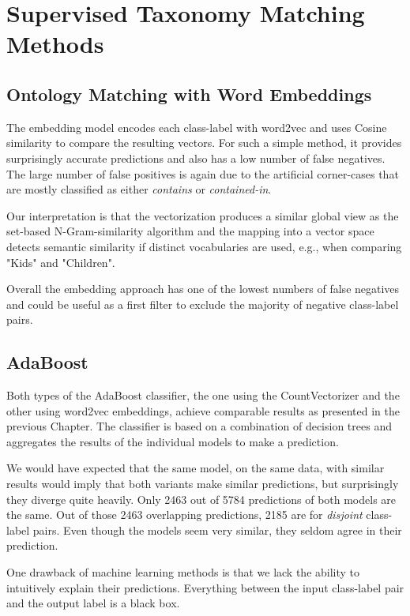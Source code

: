 \section{Supervised Taxonomy Matching Methods}

\subsection{Ontology Matching with Word Embeddings}

The embedding model encodes each class-label with word2vec and uses Cosine similarity to compare the resulting vectors.
For such a simple method, it provides surprisingly accurate predictions and also has a low number of false negatives.
The large number of false positives is again due to the artificial corner-cases that are mostly classified as either
\emph{contains} or \emph{contained-in}.

Our interpretation is that the vectorization produces a similar global view as the set-based N-Gram-similarity algorithm
and the mapping into a vector space detects semantic similarity if distinct vocabularies are used, e.g., when
comparing "Kids" and "Children".

Overall the embedding approach has one of the lowest numbers of false negatives and could be useful as a first filter
to exclude the majority of negative class-label pairs.

\subsection{AdaBoost}

Both types of the AdaBoost classifier, the  one using the CountVectorizer and the other using word2vec embeddings,
achieve comparable results as presented in the previous Chapter.
The classifier is based on a combination of decision trees and aggregates the results of the individual models to make a
prediction.

We would have expected that the same model, on the same data, with similar results would imply that both variants
make similar predictions, but surprisingly they diverge quite heavily.
Only 2463 out of 5784 predictions of both models are the same.
Out of those 2463 overlapping predictions, 2185 are for \emph{disjoint} class-label pairs.
Even though the models seem very similar, they seldom agree in their prediction.

One drawback of machine learning methods is that we lack the ability to intuitively explain their predictions.
Everything between the input class-label pair and the output label is a black box.

